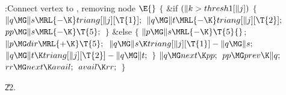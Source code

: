 \B{}:Connect vertex  to , removing
node \X${}\E{}$\6
${}\{{}$\1\6
\&{if} ${}(\|k>\\{thresh1}[\|j]){}$\5
${}\{{}$\1\6
${}\|q\MG\|s\MRL{-{\K}}\\{triang}[\|j][\T{1}];{}$\6
${}\|q\MG\|t\MRL{-{\K}}\\{triang}[\|j][\T{2}];{}$\6
${}\\{pp}\MG\|s\MRL{-{\K}}\T{5};{}$\6
\4${}\}{}$\2\6
\&{else}\5
${}\{{}$\1\6
${}\|p\MG\|s\MRL{-{\K}}\T{5}{}$;\6
${}\|p\MG\\{dir}\MRL{+{\K}}\T{5};{}$\6
${}\|q\MG\|s\K\\{triang}[\|j][\T{1}]-\|q\MG\|s;{}$\6
${}\|q\MG\|t\K\\{triang}[\|j][\T{2}]-\|q\MG\|t;{}$\6
\4${}\}{}$\2\6
${}\|q\MG\\{next}\K\\{pp};{}$\6
${}\\{pp}\MG\\{prev}\K\|q;{}$\6
${}\\{rr}\MG\\{next}\K\\{avail};{}$\6
${}\\{avail}\K\\{rr};{}$\6
\4${}\}{}$\2\par
\U22.\fi

